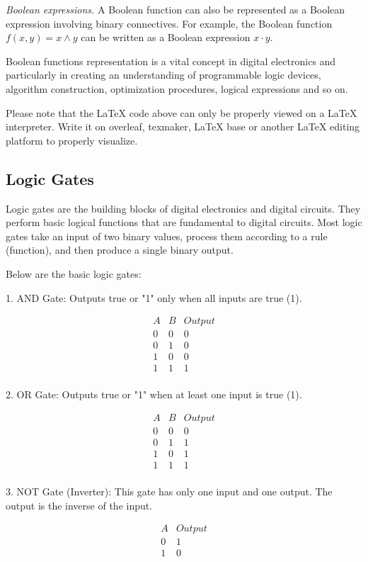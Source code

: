 {\it Boolean expressions.} A Boolean function can also be represented as a Boolean expression involving binary connectives. For example, the Boolean function $f(x, y) = x \land y$ can be written as a Boolean expression $x \cdot y$.

Boolean functions representation is a vital concept in digital electronics and particularly in creating an understanding of programmable logic devices, algorithm construction, optimization procedures, logical expressions and so on.

Please note that the LaTeX code above can only be properly viewed on a LaTeX interpreter. Write it on overleaf, texmaker, LaTeX base or another LaTeX editing platform to properly visualize.

\subsection{Logic Gates}
Logic gates are the building blocks of digital electronics and digital circuits. They perform basic logical functions that are fundamental to digital circuits. Most logic gates take an input of two binary values, process them according to a rule (function), and then produce a single binary output. 

Below are the basic logic gates:

1. AND Gate: Outputs true or "1" only when all inputs are true (1).

\[
\begin{align*}
A & B & Output \\
0 & 0 & 0 \\
0 & 1 & 0 \\
1 & 0 & 0 \\
1 & 1 & 1 \\
\end{align*}
\]

2. OR Gate: Outputs true or "1" when at least one input is true (1).

\[
\begin{align*}
A & B & Output \\
0 & 0 & 0 \\
0 & 1 & 1 \\
1 & 0 & 1 \\
1 & 1 & 1 \\
\end{align*}
\]

3. NOT Gate (Inverter): This gate has only one input and one output. The output is the inverse of the input.

\[
\begin{align*}
A & Output \\
0 & 1 \\
1 & 0 \\
\end{align*}
\]

